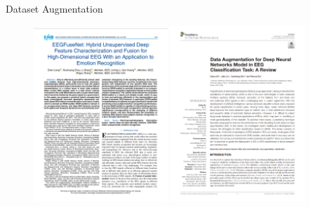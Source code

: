 \begin{frame}{Dataset Augmentation}
\begin{figure}
    \includegraphics[width=0.45\textwidth]{figures/literature/augmentation/EEGFuseNet_paper}
    \includegraphics[width=0.45\textwidth]{figures/literature/augmentation/NoiseInjection_paper}
\end{figure}
\end{frame}

